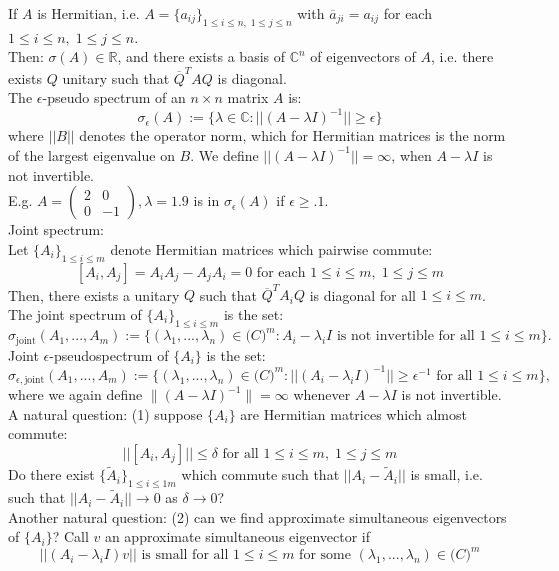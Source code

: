 \documentclass[a4paper]{article}
\begin{document}
If $A$ is Hermitian, i.e. $A = \{a_{ij}\}_{1 \leq i \leq n, \; 1 \leq j \leq n}$ with $\overline{a}_{ji} = a_{ij}$ for each $1 \leq i \leq n, \; 1 \leq j \leq n$.\\
Then: $\sigma(A) \in \mathbb{R}$, and there exists a basis of $\mathbb{C}^n$ of eigenvectors of $A$, i.e. there exists $Q$ unitary such that $\overline{Q}^TAQ$ is diagonal.\\
The $\epsilon$-pseudo spectrum of an $n\times n$ matrix $A$ is:
$$\sigma_\epsilon (A) := \{\lambda \in \mathbb{C} : ||(A - \lambda I)^{-1}|| \geq \epsilon\}$$
where $||B||$ denotes the operator norm, which for Hermitian matrices is the norm of the largest eigenvalue on $B$. We define $||(A - \lambda I)^{-1}|| = \infty$, when $A - \lambda I$ is not invertible.	\\
E.g. $A = \begin{pmatrix}2&0\\0&-1\end{pmatrix}, \lambda = 1.9$ is in $\sigma_\epsilon(A)$ if $\epsilon \geq .1$.\\
Joint spectrum:\\
Let $\{A_i\}_{1 \leq i \leq m}$ denote Hermitian matrices which pairwise commute:
$$[A_i,A_j] = A_iA_j - A_jA_i = 0 \text{ for each } 1 \leq i \leq m, \; 1 \leq j \leq m$$
Then, there exists a unitary $Q$ such that $\overline{Q}^TA_iQ$ is diagonal for all $1 \leq i \leq m$. The joint spectrum of $\{A_i\}_{1 \leq i \leq m}$ is the set:
$$\sigma_{\text{joint}}(A_1,...,A_m) := \{(\lambda_1,...,\lambda_n) \in \mathbb(C)^m : A_i - \lambda_i I \text{ is not invertible for all } 1 \leq i \leq m\}.$$
Joint $\epsilon$-pseudospectrum of $\{A_i\}$ is the set:
$$\sigma_{\epsilon,\text{joint}} (A_1,...,A_m) := \{(\lambda_1,...,\lambda_n) \in \mathbb(C)^m : ||(A_i - \lambda_i I)^{-1}|| \geq \epsilon^{-1} \text{ for all } 1 \leq i \leq m\},$$
where we again define $\| (A - \lambda I)^{-1} \| = \infty$ whenever $A - \lambda I$ is not invertible. 
A natural question: (1) suppose $\{A_i\}$ are Hermitian matrices which almost commute:
$$||[A_i, A_j]|| \leq \delta \text{ for all } 1 \leq i \leq m,\; 1 \leq j \leq m$$
Do there exist $\{\widetilde{A}_i\}_{1 \leq i \le1 m}$ which commute such that $||A_i - \widetilde{A}_i||$ is small, i.e. such that $||A_i - \widetilde{A}_i|| \rightarrow 0$ as $\delta \rightarrow 0$?\\
Another natural question: (2) can we find approximate simultaneous eigenvectors of $\{A_i\}$? Call $v$ an approximate simultaneous eigenvector if
$$||(A_i - \lambda_i I)v|| \text{ is small for all } 1 \leq i \leq m \text{ for some } (\lambda_1,...,\lambda_n) \in \mathbb(C)^m$$

\printbibliography
\end{document}
